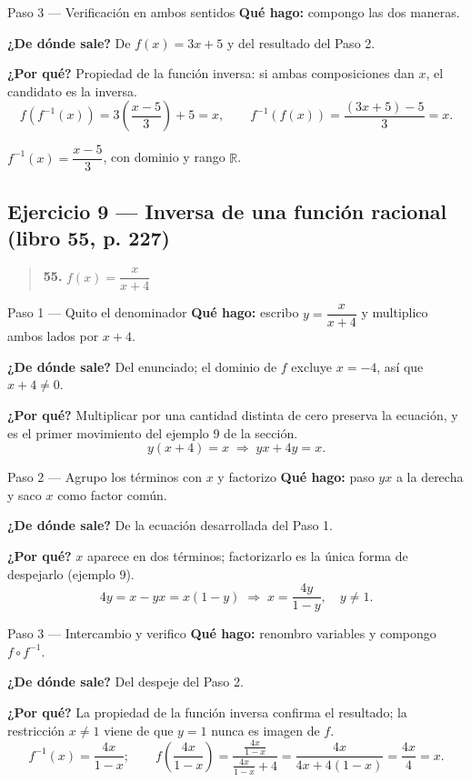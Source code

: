 \documentclass[11pt]{article}
\begin{document}
\begin{paso}{Paso 3 --- Verificación en ambos sentidos}
\textbf{Qué hago:} compongo las dos maneras.

\textbf{¿De dónde sale?} De $f(x)=3x+5$ y del resultado del Paso 2.

\textbf{¿Por qué?} Propiedad de la función inversa: si ambas composiciones dan $x$, el candidato es la inversa.
\[
f\!\left(f^{-1}(x)\right)=3\!\left(\frac{x-5}{3}\right)+5=x, \qquad
f^{-1}\!\left(f(x)\right)=\frac{(3x+5)-5}{3}=x.
\]
\end{paso}

\begin{resp}
$f^{-1}(x)=\dfrac{x-5}{3}$, con dominio y rango $\mathbb{R}$.
\end{resp}

\subsection*{Ejercicio 9 --- Inversa de una función racional (libro 55, p. 227)}

\begin{quote}
\textbf{55.} $f(x)=\dfrac{x}{x+4}$
\end{quote}

\begin{paso}{Paso 1 --- Quito el denominador}
\textbf{Qué hago:} escribo $y=\dfrac{x}{x+4}$ y multiplico ambos lados por $x+4$.

\textbf{¿De dónde sale?} Del enunciado; el dominio de $f$ excluye $x=-4$, así que $x+4\neq 0$.

\textbf{¿Por qué?} Multiplicar por una cantidad distinta de cero preserva la ecuación, y es el primer movimiento del ejemplo 9 de la sección.
\[
y(x+4)=x \;\Longrightarrow\; yx+4y=x.
\]
\end{paso}

\begin{paso}{Paso 2 --- Agrupo los términos con $x$ y factorizo}
\textbf{Qué hago:} paso $yx$ a la derecha y saco $x$ como factor común.

\textbf{¿De dónde sale?} De la ecuación desarrollada del Paso 1.

\textbf{¿Por qué?} $x$ aparece en dos términos; factorizarlo es la única forma de despejarlo (ejemplo 9).
\[
4y=x-yx=x(1-y) \;\Longrightarrow\; x=\frac{4y}{1-y}, \quad y\neq 1.
\]
\end{paso}

\begin{paso}{Paso 3 --- Intercambio y verifico}
\textbf{Qué hago:} renombro variables y compongo $f\circ f^{-1}$.

\textbf{¿De dónde sale?} Del despeje del Paso 2.

\textbf{¿Por qué?} La propiedad de la función inversa confirma el resultado; la restricción $x\neq 1$ viene de que $y=1$ nunca es imagen de $f$.
\[
f^{-1}(x)=\frac{4x}{1-x};\qquad
f\!\left(\frac{4x}{1-x}\right)=\frac{\frac{4x}{1-x}}{\frac{4x}{1-x}+4}
=\frac{4x}{4x+4(1-x)}=\frac{4x}{4}=x.
\]
\end{paso}
\end{document}
